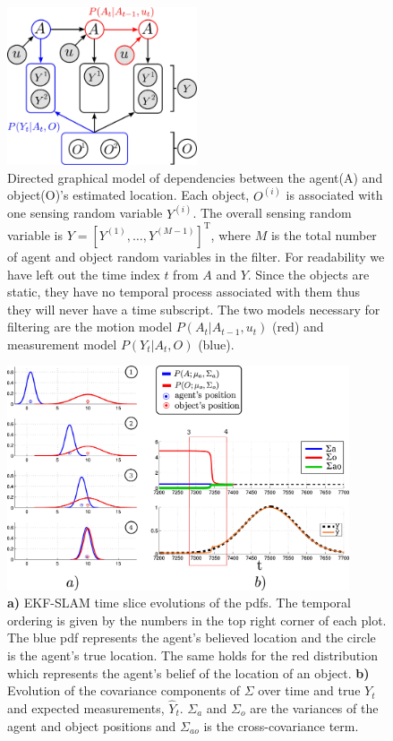 \documentclass{frontiersSCNS} %
\begin{document}
\begin{figure}
\centering
\includegraphics[width=0.5\textwidth]{Figure2}
\caption{Directed graphical model of dependencies between the agent(A) and object(O)'s estimated location. Each 
object, $O^{(i)}$ is associated with one sensing random variable $Y^{(i)}$. The overall sensing random variable is $Y = \left[Y^{(1)},\dots,Y^{(M-1)}\right]^{\mathrm{T}}$,
where $M$ is the total number of agent and object random variables in the filter. 
For readability we have left out the time index $t$ from $A$ and $Y$. Since the objects are static, they have no temporal process associated with 
them thus they will never have a time subscript. The two models necessary for filtering are the motion model $P(A_t|A_{t-1},u_t)$ (red) and measurement model
$P(Y_t|A_t,O)$ (blue).}
\label{fig:bayesian_sse_dag}
\end{figure}

\begin{figure}
\centering
 \includegraphics[width=0.9\textwidth]{Figure3}
\caption{\textbf{a)} EKF-SLAM time slice evolutions of the pdfs. 
The temporal ordering is given by the numbers in the top right corner of each plot.
The blue pdf represents the agent's believed location and the circle is the agent's true location. The same holds 
for the red distribution which represents the agent's belief of the location of an object.
\textbf{b)} Evolution of the covariance components of $\Sigma$ over time and true $Y_t$ and expected measurements,  $\hat{Y}_t$. 
$\Sigma_a$ and $\Sigma_o$ are the variances of the agent and object positions and $\Sigma_{ao}$ is the cross-covariance 
term.}
\label{fig:EKF-SLAM}
\end{figure}
\end{document}
